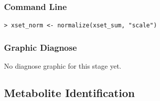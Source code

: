 \documentclass[11pt,a4paper]{article}
\begin{document}
\subsubsection*{Command Line}
\begin{verbatim}
> xset_norm <- normalize(xset_sum, "scale")
\end{verbatim}

\subsubsection*{Graphic Diagnose}
No diagnose graphic for this stage yet.

\newpage
\subsection{Metabolite Identification}
\end{document}
